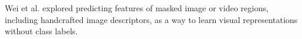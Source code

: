 Wei et al. explored predicting features of masked image or video regions, including handcrafted image descriptors, as a way to learn visual representations without class labels.
